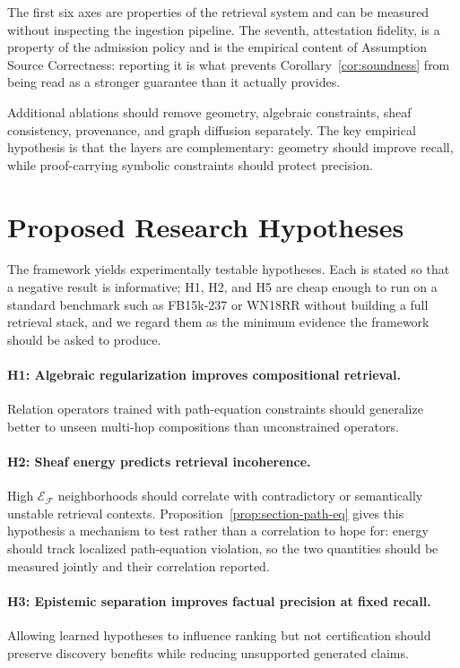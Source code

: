 \documentclass[11pt]{article}
\newcommand{\Energy}{\mathcal{E}}
\newcommand{\F}{\mathcal{F}}
\begin{document}
The first six axes are properties of the retrieval system and can be measured without inspecting the ingestion pipeline. The seventh, attestation fidelity, is a property of the admission policy and is the empirical content of Assumption Source Correctness: reporting it is what prevents Corollary~\ref{cor:soundness} from being read as a stronger guarantee than it actually provides.

Additional ablations should remove geometry, algebraic constraints, sheaf consistency, provenance, and graph diffusion separately. The key empirical hypothesis is that the layers are complementary: geometry should improve recall, while proof-carrying symbolic constraints should protect precision.

\section{Proposed Research Hypotheses}
\label{sec:hypotheses}

The framework yields experimentally testable hypotheses. Each is stated so that a negative result is informative; H1, H2, and H5 are cheap enough to run on a standard benchmark such as FB15k-237 or WN18RR without building a full retrieval stack, and we regard them as the minimum evidence the framework should be asked to produce.

\paragraph{H1: Algebraic regularization improves compositional retrieval.}
Relation operators trained with path-equation constraints should generalize better to unseen multi-hop compositions than unconstrained operators.

\paragraph{H2: Sheaf energy predicts retrieval incoherence.}
High $\Energy_{\F}$ neighborhoods should correlate with contradictory or semantically unstable retrieval contexts. Proposition~\ref{prop:section-path-eq} gives this hypothesis a mechanism to test rather than a correlation to hope for: energy should track localized path-equation violation, so the two quantities should be measured jointly and their correlation reported.

\paragraph{H3: Epistemic separation improves factual precision at fixed recall.}
Allowing learned hypotheses to influence ranking but not certification should preserve discovery benefits while reducing unsupported generated claims.
\end{document}
